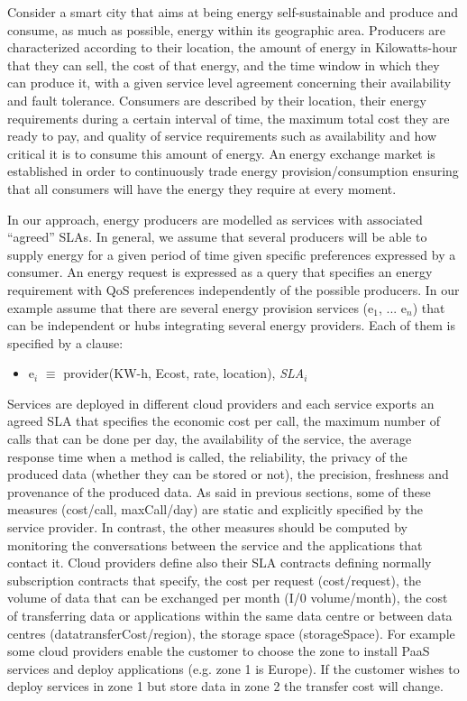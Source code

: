 Consider a smart city that aims at being energy self-sustainable and produce and consume, as much as possible, energy within its geographic area. 
Producers are characterized according to their location, the amount of energy in Kilowatts-hour that they can sell, the cost of that energy, and the time window in which they can produce it, with a given service level agreement concerning their availability and fault tolerance. 
Consumers are described by their location, their energy requirements during a certain interval of time, the maximum total cost they are ready to pay, and quality of service requirements such as availability and how critical it is to consume this amount of energy. 
An energy exchange market is established in order to continuously trade  energy provision/consumption ensuring that all consumers will have the energy they require at every moment.

In our approach, energy producers are modelled as services with associated ``agreed'' SLAs. 
In general, we assume that several producers will be able to supply energy for a given period of time given specific  preferences expressed by a consumer. 
An energy request is expressed as a query that specifies an energy requirement with QoS preferences independently of the possible producers. 
In our example assume that there are several energy provision services ({\sf e$_1$, ... e$_n$}) that can be independent or hubs integrating several energy providers. 
Each of them is specified by a clause:
\begin{itemize}
\sf\footnotesize
\item e$_i$ $\equiv$ provider(KW-h, Ecost, rate, location), \textit{SLA}$_i$
\end{itemize}

Services are deployed in different cloud providers and each service exports an agreed SLA that specifies the economic cost per call, the maximum number of calls that can be done per day, the availability of the service, the average response time when a method is called, the reliability, the privacy of the produced data (whether they can be stored or not), the precision, freshness and provenance of the produced data. 
As said in previous sections, some of these measures ({\sf cost/call, maxCall/day}) are static and explicitly specified by the service provider. 
In contrast, the other measures should be computed by monitoring the conversations between the service and the applications that contact it.  
Cloud providers define also their SLA contracts defining normally subscription contracts that specify, the cost per request ({\sf cost/request}), the volume of data that can be exchanged per month ({\sf I/0 volume/month}), the cost of transferring data or applications within the same data centre or between data centres ({\sf datatransferCost/region}), the storage space ({\sf storageSpace}). For example some cloud providers enable the customer to choose the zone to install PaaS services and deploy applications (e.g. zone 1 is Europe). If the customer wishes to deploy services in zone 1 but store data in zone 2 the transfer cost will change.


